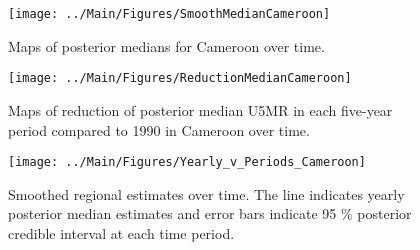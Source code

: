 \documentclass[12pt]{article}\usepackage[]{graphicx}\usepackage[]{color}
\newenvironment{knitrout}{}{} %
\begin{document}
\begin{knitrout}
\color{fgcolor}\begin{figure}[bht]

{\centering \texttt{[image: ../Main/Figures/SmoothMedianCameroon]} 

}

\caption[Maps of posterior medians for Cameroon  over time]{Maps of posterior medians for Cameroon  over time.}\label{fig:unnamed-chunk-44}
\end{figure}


\end{knitrout}
\begin{knitrout}
\color{fgcolor}\begin{figure}[bht]

{\centering \texttt{[image: ../Main/Figures/ReductionMedianCameroon]} 

}

\caption[Maps of reduction of posterior median U5MR in each five-year period compared to 1990 in Cameroon over time]{Maps of reduction of posterior median U5MR in each five-year period compared to 1990 in Cameroon over time.}\label{fig:unnamed-chunk-45}
\end{figure}


\end{knitrout}
\begin{knitrout}
\color{fgcolor}\begin{figure}[bht]

{\centering \texttt{[image: ../Main/Figures/Yearly\_v\_Periods\_Cameroon]} 

}

\caption[Smoothed regional estimates over time]{Smoothed regional estimates over time. The line indicates yearly posterior median estimates and error bars indicate 95 \% posterior credible interval at each time period.}\label{fig:unnamed-chunk-46}
\end{figure}


\end{knitrout}
\end{document}
